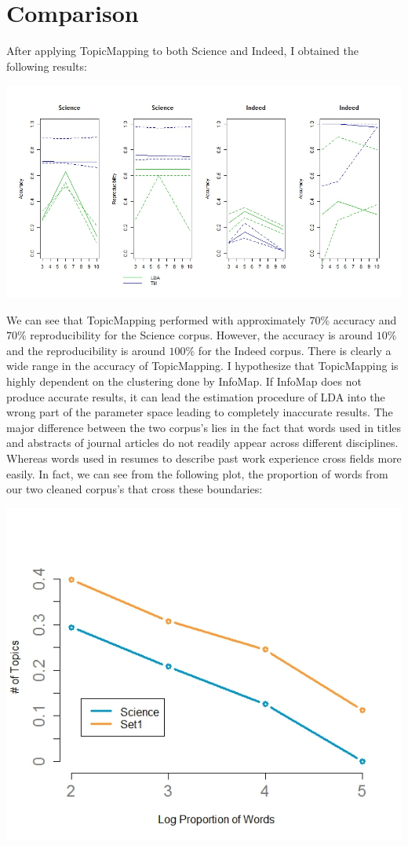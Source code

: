 \documentclass[12pt]{article}
\begin{document}
\section{Comparison}
After applying TopicMapping to both Science and Indeed, I obtained the following results: 
\vspace{2mm}
\begin{center}
	\includegraphics[scale=0.5]{Images/comparison1.jpeg}
\end{center} 
\vspace{2mm} 
We can see that TopicMapping performed with approximately $70\%$ accuracy and $70\%$ reproducibility for the Science corpus. However, the accuracy is around $10\%$ and the reproducibility is around $100\%$ for the Indeed corpus. There is clearly a wide range in the accuracy of TopicMapping. I hypothesize that TopicMapping is highly dependent on the clustering done by InfoMap. If InfoMap does not produce accurate results, it can lead the estimation procedure of LDA into the wrong part of the parameter space leading to completely inaccurate results. The major difference between the two corpus's lies in the fact that words used in titles and abstracts of journal articles do not readily appear across different disciplines. Whereas words used in resumes to describe past work experience cross fields more easily. In fact, we can see from the following plot, the proportion of words from our two cleaned corpus's that cross these boundaries:
\begin{center}
	\includegraphics[scale=0.5]{Images/props.jpeg}
\end{center} 
\end{document}
